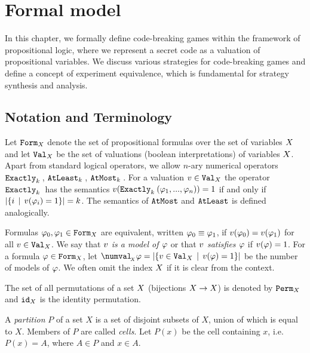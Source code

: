 \chapter{Formal model}

In this chapter, we formally define code-breaking games
  within the framework of propositional logic,
  where we represent a secret code as a valuation
  of propositional variables.
We discuss various strategies for code-breaking games and
  define a concept of experiment equivalence,
  which is fundamental for strategy synthesis and analysis.

\section{Notation and Terminology}
Let $\mathtt{Form}_X$ denote the set of propositional formulas over
  the set of variables $X$ and let
  $\mathtt{Val}_X$ be the set of valuations (boolean interpretations)
  of variables $X$.
Apart from standard logical operators, we allow $n$-ary numerical operators
  $\mathtt{Exactly}_{k}\:$, $\mathtt{AtLeast}_{k}\:$, $\mathtt{AtMost}_{k}\:$.
For a valuation $v\in\mathtt{Val}_X$ the operator $\mathtt{Exactly}_{k}\:$ has the semantics
  $v(\mathtt{Exactly}_{k}\:(\varphi_1,...,\varphi_n)) = 1$ if and only if
  $|\{i \:\:|\:\: v(\varphi_i) = 1 \}| = k$.
The semantics of $\mathtt{AtMost}$ and $\mathtt{AtLeast}$ is defined analogically.

Formulas $\varphi_0, \varphi_1 \in \mathtt{Form}_X$ are equivalent,
  written $\varphi_0 \equiv \varphi_1$, if
  $v(\varphi_0) = v(\varphi_1)$ for all $v\in\mathtt{Val}_X$.
We say that \emph{$v$ is a model of $\varphi$}
  or that \emph{$v$ satisfies $\varphi$}
  if $v(\varphi) = 1$.
For a formula $\varphi\in\mathtt{Form}_X$, let
  $\numval_{\!_\Var}{\form} = |\{ \val\in\Val_\Var \| \val(\form) = 1 \}|$
  be the number of models of $\varphi$.
We often omit the index $X$ if it is clear from the context.


The set of all permutations of a set $X$ (bijections $X->X$)
  is denoted by $\mathtt{Perm}_X$ and
  $\mathtt{id}_X$ is the identity permutation.

A \emph{partition} $P$ of a set $X$ is a set of disjoint subsets of $X$,
  union of which is equal to $X$.
Members of $P$ are called \emph{cells}.
Let $P(x)$ be the cell containing $x$,
  i.e. $P(x) = A$, where $A\in P$ and $x\in A$.

